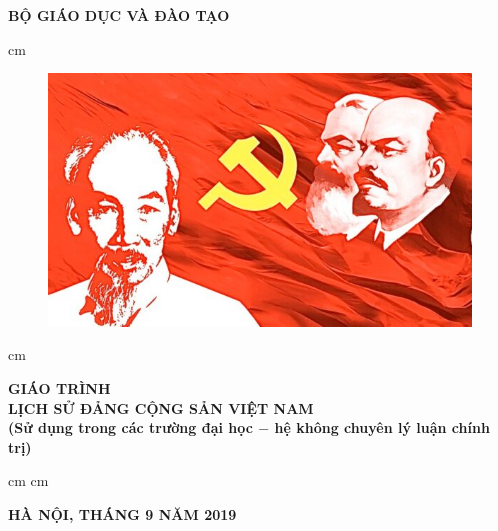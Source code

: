 \begin{titlepage}
\begin{mybox}
\begin{center}
\fontsize{12}{12}\selectfont
\textbf{BỘ GIÁO DỤC VÀ ĐÀO TẠO}
\end{center}
 cm
\begin{figure}[H]
\begin{center}
\includegraphics[scale=0.5]{images/CPV-logo}
\end{center}
\end{figure}
 cm
\begin{center}
\fontsize{18}{14}\selectfont
\textbf{GIÁO TRÌNH}\\
\fontsize{20}{16}\selectfont
\textbf{LỊCH SỬ ĐẢNG CỘNG SẢN VIỆT NAM}\\
\fontsize{18}{12}\selectfont
\textbf{(Sử dụng trong các trường đại học $-$ hệ không chuyên lý luận chính trị)}
\end{center}
 cm
 cm
\begin{center}
\textbf{HÀ NỘI, THÁNG 9 NĂM 2019}
\end{center}
\end{mybox}
\end{titlepage}